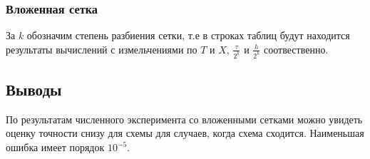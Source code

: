 \newpage
\subsubsection{Вложенная сетка}
За $k$ обозначим степень разбиения сетки, т.е в строках таблиц будут находится результаты вычислений с измельчениями по $T$ и $X$, $\frac{\tau}{2^k}$ и $\frac{h}{2^k}$ соотвественно.



\newpage


\newpage

\newpage

\newpage

\newpage

\newpage

\newpage

\newpage

\newpage

\newpage

\newpage

\newpage

\newpage

\newpage

\newpage

\newpage

\newpage

\newpage

\newpage

\newpage

\newpage

\newpage

\newpage


\subsection{Выводы}
По результатам численного эксперимента со вложенными сетками можно увидеть оценку точности снизу для схемы для случаев, когда схема сходится. Наименьшая ошибка имеет порядок $10^{-5}$.